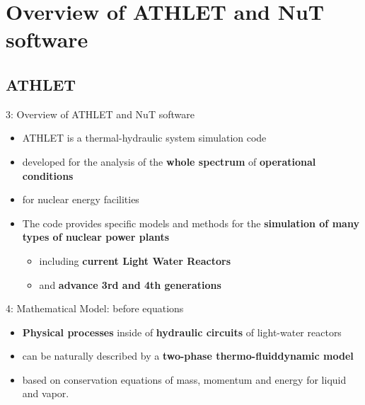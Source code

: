 \section{Overview of ATHLET and NuT software}


\subsection{ATHLET}
\ifSpeech
\begin{frame}[t]{3: Overview of ATHLET and NuT software}
  \justifying
  
  \begin{itemize}
    \setlength\itemsep{0.5cm}
      \item ATHLET is a thermal-hydraulic system simulation code
      
      \item developed for the analysis of the \textbf{whole spectrum} of \textbf{operational conditions}
      
      \item for nuclear energy facilities
      
    \item The code provides specific models and methods for the \textbf{simulation of many types of nuclear power plants} 
        \begin{itemize}
             \setlength\itemsep{0.5cm}
            \item including \textbf{current Light Water Reactors}
            \item and \textbf{advance 3rd and 4th generations}
        \end{itemize}
    
  \end{itemize}

\end{frame}

\begin{frame}[t]{4: Mathematical Model: before equations}
    \justifying
    
    \begin{itemize}
        \setlength\itemsep{0.5cm}
    
        \item \textbf{Physical processes} inside of \textbf{hydraulic circuits} of light-water reactors
        
        \item can be naturally described by a \textbf{two-phase thermo-fluiddynamic model}
        
        \item  based on conservation equations of mass, momentum and energy for liquid and vapor.
    \end{itemize}

\end{frame}
\fi


